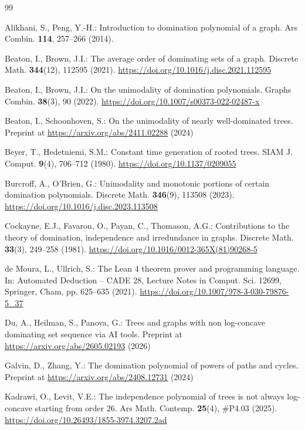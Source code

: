 \documentclass[smallextended,envcountsect,envcountsame]{svjour3}
\begin{document}
\begin{thebibliography}{99}

 Alikhani, S., Peng, Y.-H.: Introduction to domination polynomial of a graph. Ars Combin. \textbf{114}, 257--266 (2014).

 Beaton, I., Brown, J.I.: The average order of dominating sets of a graph. Discrete Math. \textbf{344}(12), 112595 (2021). \url{https://doi.org/10.1016/j.disc.2021.112595}

 Beaton, I., Brown, J.I.: On the unimodality of domination polynomials. Graphs Combin. \textbf{38}(3), 90 (2022). \url{https://doi.org/10.1007/s00373-022-02487-x}

 Beaton, I., Schoonhoven, S.: On the unimodality of nearly well-dominated trees. Preprint at \url{https://arxiv.org/abs/2411.02288} (2024)

 Beyer, T., Hedetniemi, S.M.: Constant time generation of rooted trees. SIAM J. Comput. \textbf{9}(4), 706--712 (1980). \url{https://doi.org/10.1137/0209055}

 Burcroff, A., O'Brien, G.: Unimodality and monotonic portions of certain domination polynomials. Discrete Math. \textbf{346}(9), 113508 (2023). \url{https://doi.org/10.1016/j.disc.2023.113508}

 Cockayne, E.J., Favaron, O., Payan, C., Thomason, A.G.: Contributions to the theory of domination, independence and irredundance in graphs. Discrete Math. \textbf{33}(3), 249--258 (1981). \url{https://doi.org/10.1016/0012-365X(81)90268-5}

 de Moura, L., Ullrich, S.: The Lean 4 theorem prover and programming language. In: Automated Deduction -- CADE 28, Lecture Notes in Comput. Sci. 12699, Springer, Cham, pp. 625--635 (2021). \url{https://doi.org/10.1007/978-3-030-79876-5_37}

 Du, A., Heilman, S., Panova, G.: Trees and graphs with non log-concave dominating set sequence via AI tools. Preprint at \url{https://arxiv.org/abs/2605.02193} (2026)

 Galvin, D., Zhang, Y.: The domination polynomial of powers of paths and cycles. Preprint at \url{https://arxiv.org/abs/2408.12731} (2024)

 Kadrawi, O., Levit, V.E.: The independence polynomial of trees is not always log-concave starting from order 26. Ars Math. Contemp. \textbf{25}(4), \#P4.03 (2025). \url{https://doi.org/10.26493/1855-3974.3207.2ad}


\end{thebibliography}
\end{document}
